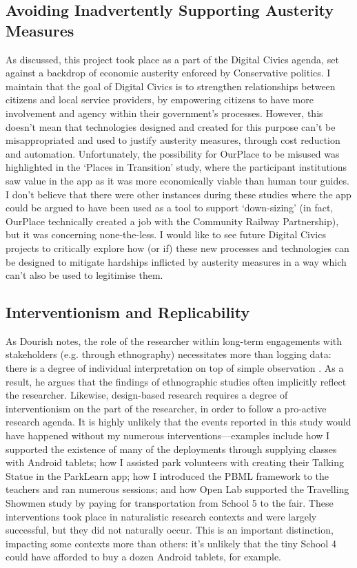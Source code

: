 \subsection*{Avoiding Inadvertently Supporting Austerity Measures} 

As discussed, this project took place as a part of the Digital Civics agenda, set against a backdrop of economic austerity enforced by Conservative politics. I maintain that the goal of Digital Civics is to strengthen relationships between citizens and local service providers, by empowering citizens to have more involvement and agency within their government’s processes. However, this doesn't mean that technologies designed and created for this purpose can't be misappropriated and used to justify austerity measures, through cost reduction and automation. Unfortunately, the possibility for OurPlace to be misused was highlighted in the `Places in Transition' study, where the participant institutions saw value in the app as it was more economically viable than human tour guides. I don't believe that there were other instances during these studies where the app could be argued to have been used as a tool to support `down-sizing' (in fact, OurPlace technically created a job with the Community Railway Partnership), but it was concerning none-the-less. I would like to see future Digital Civics projects to critically explore how (or if) these new processes and technologies can be designed to mitigate hardships inflicted by austerity measures in a way which can't also be used to legitimise them.

\subsection*{Interventionism and Replicability}

As Dourish notes, the role of the researcher within long-term engagements with stakeholders (e.g. through ethnography) necessitates more than logging data: there is a degree of individual interpretation on top of simple observation \citep{Dourish2006}. As a result, he argues that the findings of ethnographic studies often implicitly reflect the researcher.  Likewise, design-based research requires a degree of interventionism on the part of the researcher, in order to follow a pro-active research agenda. It is highly unlikely that the events reported in this study would have happened without my numerous interventions---examples include how I supported the existence of many of the deployments through supplying classes with Android tablets; how I assisted park volunteers with creating their Talking Statue in the ParkLearn app; how I introduced the PBML framework to the teachers and ran numerous sessions; and how Open Lab supported the Travelling Showmen study by paying for transportation from School 5 to the fair. These interventions took place in naturalistic research contexts and were largely successful, but they did not naturally occur. This is an important distinction, impacting some contexts more than others: it's unlikely that the tiny School 4 could have afforded to buy a dozen Android tablets, for example.

